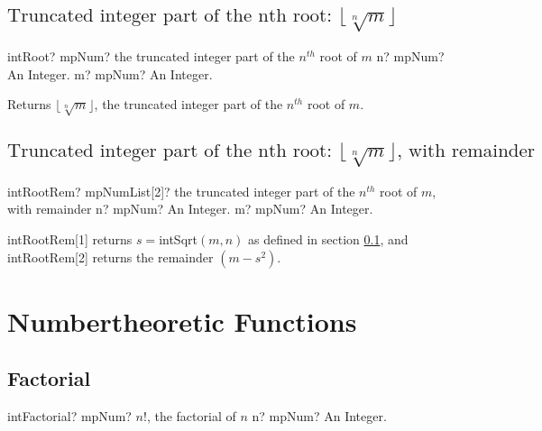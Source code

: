 \subsection{\texorpdfstring{$\text{Truncated integer part of the nth root: }\lfloor\sqrt[n]{m}\rfloor$}{sqrt}}

\label{intRoot}
\begin{mpFunctionsExtract}
	\mpFunctionTwo
	{intRoot? mpNum? the truncated integer part of the $n^{th}$ root of $m$}
	{n? mpNum? An Integer.}
	{m? mpNum? An Integer.}
\end{mpFunctionsExtract}

\vspace{0.3cm}
Returns $\lfloor\sqrt[n]{m}\rfloor$,  the truncated integer part of the $n^{th}$ root of $m$.




\subsection{\texorpdfstring{$\text{Truncated integer part of the nth root: }\lfloor\sqrt[n]{m}\rfloor\text{, with remainder}$}{sqrt}}

\begin{mpFunctionsExtract}
	\mpFunctionTwo
	{intRootRem? mpNumList[2]? the truncated integer part of the $n^{th}$ root of $m$, with remainder}
	{n? mpNum? An Integer.}
	{m? mpNum? An Integer.}
\end{mpFunctionsExtract}

\vspace{0.3cm}
\textsf{intRootRem}[1] returns $s = $\textsf{intSqrt$(m,n)$} as defined in section \ref{intRoot}, and \textsf{intRootRem}[2] returns  the remainder $(m - s^2)$.







\section{Numbertheoretic Functions}
\label{NumbertheoreticFunctions}



\subsection{Factorial}


\begin{mpFunctionsExtract}
	\mpFunctionOne
	{intFactorial? mpNum?  $n!$, the factorial of $n$}
	{n? mpNum? An Integer.}
\end{mpFunctionsExtract}





